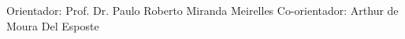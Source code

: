\begin{frame}
    \titlepage
    Orientador: Prof. Dr. Paulo Roberto Miranda Meirelles
    Co-orientador: Arthur de Moura Del Esposte
\end{frame}
